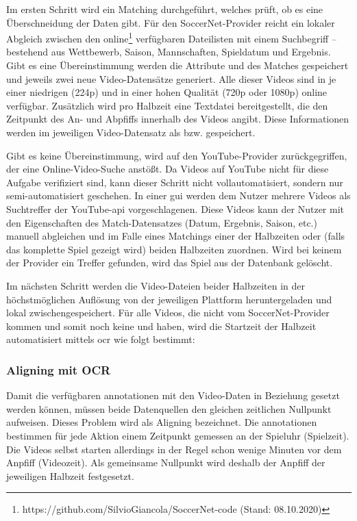 Im ersten Schritt wird ein Matching durchgeführt, welches prüft, ob es eine Überschneidung der Daten gibt.
Für den SoccerNet-Provider reicht ein lokaler Abgleich zwischen den online\footnote{https://github.com/SilvioGiancola/SoccerNet-code (Stand: 08.10.2020)} verfügbaren Dateilisten mit einem Suchbegriff -- bestehend aus Wettbewerb, Saison, Mannschaften, Spieldatum und Ergebnis.
Gibt es eine Übereinstimmung werden die Attribute  und  des Matches gespeichert und jeweils zwei neue Video-Datensätze generiert.
Alle dieser Videos sind in je einer niedrigen (224p) und in einer hohen Qualität (720p oder 1080p) online verfügbar.
Zusätzlich wird pro Halbzeit eine Textdatei bereitgestellt, die den Zeitpunkt des An- und Abpfiffs innerhalb des Videos angibt.
Diese Informationen werden im jeweiligen Video-Datensatz als  bzw.  gespeichert.

Gibt es keine Übereinstimmung, wird auf den YouTube-Provider zurückgegriffen, der eine Online-Video-Suche anstößt.
Da Videos auf YouTube nicht für diese Aufgabe verifiziert sind, kann dieser Schritt nicht vollautomatisiert, sondern nur semi-automatisiert geschehen.
In einer \gls{gui} werden dem Nutzer mehrere Videos als Suchtreffer der YouTube-\gls{api} vorgeschlagenen.
Diese Videos kann der Nutzer mit den Eigenschaften des Match-Datensatzes (Datum, Ergebnis, Saison, etc.) manuell abgleichen und im Falle eines Matchings einer der Halbzeiten oder (falls das komplette Spiel gezeigt wird) beiden Halbzeiten zuordnen.
Wird bei keinem der Provider ein Treffer gefunden, wird das Spiel aus der Datenbank gelöscht.

Im nächsten Schritt werden die Video-Dateien beider Halbzeiten in der höchstmöglichen Auflösung von der jeweiligen Plattform heruntergeladen und lokal zwischengespeichert.
Für alle Videos, die nicht vom SoccerNet-Provider kommen und somit noch keine  und  haben, wird die Startzeit der Halbzeit automatisiert mittels \gls{ocr} wie folgt bestimmt:

\subsubsection{Aligning mit OCR}

Damit die verfügbaren \gls{annotationen} mit den Video-Daten in Beziehung gesetzt werden können, müssen beide Datenquellen den gleichen zeitlichen Nullpunkt aufweisen.
Dieses Problem wird als Aligning bezeichnet.
Die \gls{annotationen} bestimmen für jede Aktion einem Zeitpunkt gemessen an der Spieluhr (Spielzeit).
Die Videos selbst starten allerdings in der Regel schon wenige Minuten vor dem Anpfiff (Videozeit).
Als gemeinsame Nullpunkt wird deshalb der Anpfiff der jeweiligen Halbzeit festgesetzt.

